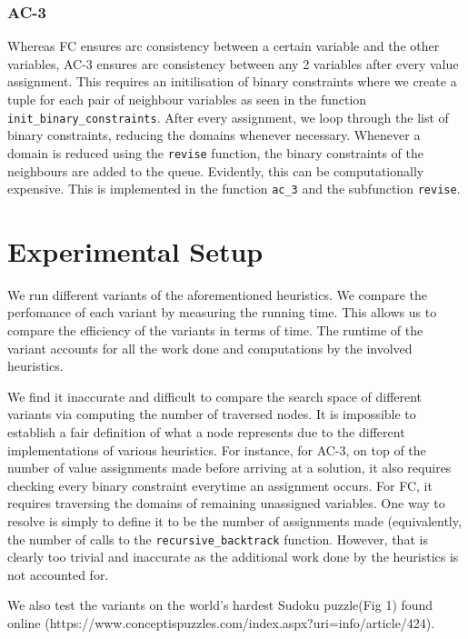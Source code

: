 \documentclass[runningheads]{llncs}
\begin{document}
\subsubsection{AC-3}

Whereas FC ensures arc consistency between a certain variable and the other variables, AC-3 ensures arc consistency between any 2 variables after every value assignment. This requires an initilisation of binary constraints where we create a tuple for each pair of neighbour variables as seen in the function \verb`init_binary_constraints`. After every assignment, we loop through the list of binary constraints, reducing the domains whenever necessary. Whenever a domain is reduced using the \verb`revise` function, the binary constraints of the neighbours are added to the queue. Evidently, this can be computationally expensive. This is implemented in the function  \verb`ac_3` and the subfunction \verb`revise`. 

\section{Experimental Setup}

We run different variants of the aforementioned heuristics. We compare the perfomance of each variant by measuring the running time. This allows us to compare the efficiency of the variants in terms of time. The runtime of the variant accounts for all the work done and computations by the involved heuristics.

We find it inaccurate and difficult to compare the search space of different variants via computing the number of traversed nodes. It is impossible to establish a fair definition of what a node represents due to the different implementations of various heuristics. For instance, for AC-3, on top of the number of value assignments made before arriving at a solution, it also requires checking every binary constraint everytime an assignment occurs. For FC,  it requires traversing the domains of remaining unassigned variables. One way to resolve is simply to define it to be the number of assignments made (equivalently, the number of calls to the \verb`recursive_backtrack` function. However, that is clearly too trivial and inaccurate as the additional work done by the heuristics is not accounted for. 

We also test the variants on the world's hardest Sudoku puzzle(Fig 1) found online (https://www.conceptispuzzles.com/index.aspx?uri=info/article/424).
\end{document}
